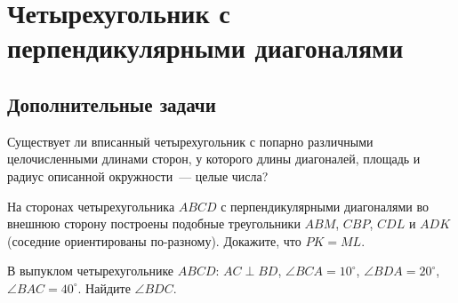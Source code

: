 
\section*{Четырехугольник с перпендикулярными диагоналями}

\subsection*{Дополнительные задачи}




\begin{problems}

\item
Существует ли вписанный четырехугольник с попарно различными целочисленными
длинами сторон, у которого длины диагоналей, площадь и радиус описанной
окружности~--- целые числа?

\item
На сторонах четырехугольника $ABCD$ с перпендикулярными диагоналями во внешнюю
сторону построены подобные треугольники $ABM$, $CBP$, $CDL$ и $ADK$
(соседние ориентированы по-разному).
Докажите, что $PK = ML$.

\item
В выпуклом четырехугольнике $ABCD$:
$AC \perp BD$,
$\angle BCA = 10^\circ$, $\angle BDA = 20^\circ$, $\angle BAC = 40^\circ$.
Найдите $\angle BDC$.

\end{problems}

